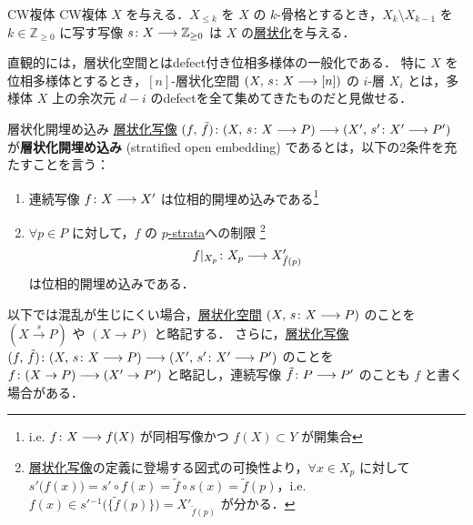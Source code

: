 \documentclass[TQFT_main]{subfiles}
\begin{document}
\begin{myexample}[label=ex:str-CW]{CW複体}
    CW複体 $X$ を与える．$X_{\le k}$ を $X$ の $k$-骨格とするとき，$X_k \setminus X_{k-1}$ を $k \in \mathbb{Z}_{\ge 0}$ に写す写像 $s \colon X \longrightarrow \mathbb{Z}_{\ge 0}$ は $X$ の\hyperref[def:stratified-space]{層状化}を与える．
\end{myexample}

直観的には，層状化空間とはdefect付き位相多様体の一般化である．
特に $X$ を位相多様体とするとき，$[n]$-層状化空間 $(X,\, s \colon X \longrightarrow [n])$ の $i$-層 $X_i$ とは，多様体 $X$ 上の余次元 $d-i$ のdefectを全て集めてきたものだと見做せる．

\begin{mydef}[label=def:strat-emb]{層状化開埋め込み}
    \hyperref[def:stratified-space]{層状化写像} $(f,\, \tilde{f}) \colon (X,\, s \colon X \longrightarrow P) \longrightarrow (X',\, s' \colon X' \longrightarrow P')$ が\textbf{層状化開埋め込み} (stratified open embedding) であるとは，以下の2条件を充たすことを言う：
    \begin{enumerate}
        \item 連続写像 $f \colon X \longrightarrow X'$ は位相的開埋め込みである\footnote{i.e. $f \colon X \longrightarrow f(X)$ が同相写像かつ $f(X) \subset Y$ が開集合}
        \item $\forall p \in P$ に対して，$f$ の \hyperref[def:stratified-space]{$p$-strata}への制限
        \footnote{\hyperref[def:stratified-space]{層状化写像}の定義に登場する図式の可換性より，$\forall x \in X_p$ に対して $s' \bigl( f(x) \bigr) = s' \circ f (x) = \tilde{f} \circ s (x) = \tilde{f}(p)$，i.e. $f(x) \in s'{}^{-1} \bigl( \{\tilde{f}(p)\} \bigr) = X'_{\tilde{f}(p)}$ が分かる．}
        \begin{align}
            f|_{X_p} \colon X_p \longrightarrow X'_{\tilde{f}(p)}
        \end{align}
        は位相的開埋め込みである．
    \end{enumerate}
\end{mydef}

\begin{marker}
    以下では混乱が生じにくい場合，\hyperref[def:stratified-space]{層状化空間} $(X,\, s \colon X \longrightarrow P)$ のことを $(X \xrightarrow{s} P)$ や $(X \to P)$ と略記する．
    さらに，\hyperref[def:stratified-space]{層状化写像} $(f,\, \tilde{f}) \colon (X,\, s \colon X \longrightarrow P) \longrightarrow (X',\, s' \colon X' \longrightarrow P')$ のことを $f \colon (X \to P) \longrightarrow (X' \to P')$ と略記し，連続写像 $\tilde{f} \colon P \longrightarrow P'$ のことも $f$ と書く場合がある．
\end{marker}
\end{document}
